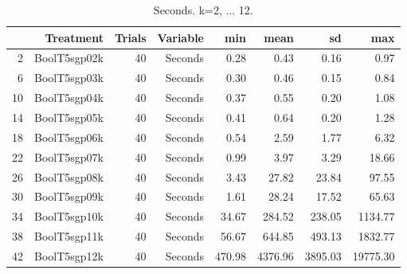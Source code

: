 \begin{table}[ht]
\centering
\begin{tabular}{rrrrrrrr}
  \hline
 & Treatment & Trials & Variable & min & mean & sd & max \\ 
  \hline
2 & BoolT5sgp02k &  40 & Seconds & 0.28 & 0.43 & 0.16 & 0.97 \\ 
  6 & BoolT5sgp03k &  40 & Seconds & 0.30 & 0.46 & 0.15 & 0.84 \\ 
  10 & BoolT5sgp04k &  40 & Seconds & 0.37 & 0.55 & 0.20 & 1.08 \\ 
  14 & BoolT5sgp05k &  40 & Seconds & 0.41 & 0.64 & 0.20 & 1.28 \\ 
  18 & BoolT5sgp06k &  40 & Seconds & 0.54 & 2.59 & 1.77 & 6.32 \\ 
  22 & BoolT5sgp07k &  40 & Seconds & 0.99 & 3.97 & 3.29 & 18.66 \\ 
  26 & BoolT5sgp08k &  40 & Seconds & 3.43 & 27.82 & 23.84 & 97.55 \\ 
  30 & BoolT5sgp09k &  40 & Seconds & 1.61 & 28.24 & 17.52 & 65.63 \\ 
  34 & BoolT5sgp10k &  40 & Seconds & 34.67 & 284.52 & 238.05 & 1134.77 \\ 
  38 & BoolT5sgp11k &  40 & Seconds & 56.67 & 644.85 & 493.13 & 1832.77 \\ 
  42 & BoolT5sgp12k &  40 & Seconds & 470.98 & 4376.96 & 3895.03 & 19775.30 \\ 
   \hline
\end{tabular}
\caption{Seconds. k=2, ... 12.} 
\end{table}
